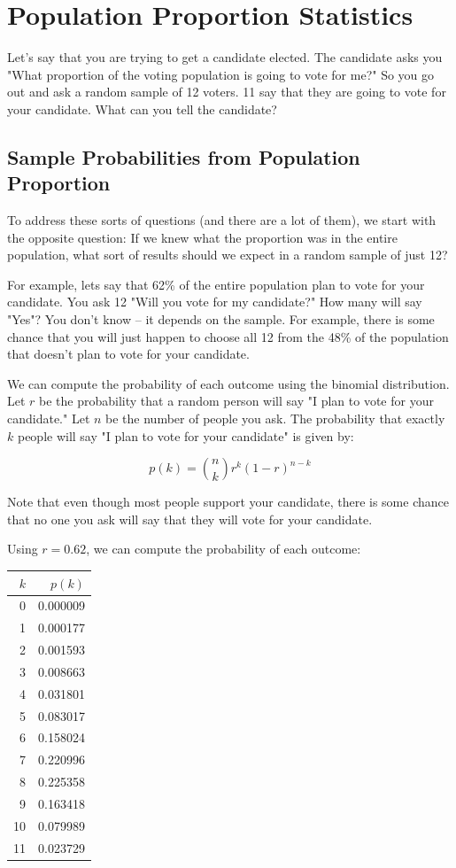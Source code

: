 \chapter{Population Proportion Statistics}

Let's say that you are trying to get a candidate elected.  The candidate asks you "What proportion of the voting population is going to vote for me?"  
So you go out and ask a random sample of 12 voters.  11 say that they are going to vote for your candidate.  What can you tell the candidate?

\section{Sample Probabilities from Population Proportion}

To address these sorts of questions (and there are a lot of them),  we start with the opposite question:  If we knew what the proportion was in the 
entire population,  what sort of results should we expect in a random sample of just 12?

For example,  lets say that 62\% of the entire population plan to vote for your candidate.    You ask 12 "Will you vote for my candidate?"  How many will say "Yes"?  You don't know -- it depends
on the sample.   For example,  there is some chance that you will just happen to choose all 12 from the 48\% of the population that doesn't plan to vote for your candidate.

We can compute the probability of each outcome using the binomial distribution.   Let $r$ be the probability that a random person will say "I plan to vote for your candidate."  Let $n$ be the number of people 
you ask.  The probability that exactly $k$ people will say "I plan to vote for your candidate"  is given by:

$$p(k) =  \binom{n}{k}r^k(1-r)^{n-k}$$

Note that even though most people support your candidate,  there is some chance that no one you ask will say that they will vote for your candidate. 

Using $r=0.62$,  we can compute the probability of each outcome:


\begin{tabular}{r | r}
$k$  & $p(k)$ \\
\hline
0 & 0.000009 \\
1 & 0.000177 \\
2 & 0.001593 \\
3 & 0.008663 \\
4 & 0.031801 \\
5 & 0.083017 \\
6 & 0.158024 \\
7 & 0.220996 \\
8 & 0.225358 \\
9 & 0.163418 \\
10 & 0.079989 \\
11 & 0.023729 
\end{tabular}

